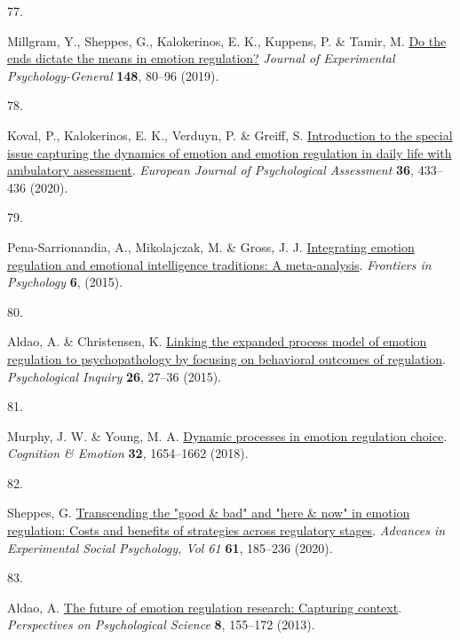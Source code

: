 \documentclass[
  man,floatsintext]{apa6}
\newlength{\cslhangindent}
\newlength{\csllabelwidth}
\newlength{\cslentryspacingunit} %
\newenvironment{CSLReferences}[2] %
 {%
  \setlength{\parindent}{0pt}
  \ifodd #1
  \let\oldpar\par
  \def\par{\hangindent=\cslhangindent\oldpar}
  \fi
  \setlength{\parskip}{#2\cslentryspacingunit}
 }%
 {}
\newcommand{\CSLLeftMargin}[1]{\parbox[t]{\csllabelwidth}{#1}}
\newcommand{\CSLRightInline}[1]{\parbox[t]{\linewidth - \csllabelwidth}{#1}\break}
\begin{document}
\begin{CSLReferences}{0}{0}
\leavevmode{}%
\CSLLeftMargin{77. }%
\CSLRightInline{Millgram, Y., Sheppes, G., Kalokerinos, E. K., Kuppens, P. \& Tamir, M. \href{https://doi.org/10.1037/xge0000477}{Do the ends dictate the means in emotion regulation?} \emph{Journal of Experimental Psychology-General} \textbf{148}, 80--96 (2019).}

\leavevmode{}%
\CSLLeftMargin{78. }%
\CSLRightInline{Koval, P., Kalokerinos, E. K., Verduyn, P. \& Greiff, S. \href{https://doi.org/10.1027/1015-5759/a000599}{Introduction to the special issue capturing the dynamics of emotion and emotion regulation in daily life with ambulatory assessment}. \emph{European Journal of Psychological Assessment} \textbf{36}, 433--436 (2020).}

\leavevmode{}%
\CSLLeftMargin{79. }%
\CSLRightInline{Pena-Sarrionandia, A., Mikolajczak, M. \& Gross, J. J. \href{https://doi.org/ARTN\%20160\%0A10.3389/fpsyg.2015.00160}{Integrating emotion regulation and emotional intelligence traditions: A meta-analysis}. \emph{Frontiers in Psychology} \textbf{6}, (2015).}

\leavevmode{}%
\CSLLeftMargin{80. }%
\CSLRightInline{Aldao, A. \& Christensen, K. \href{https://doi.org/10.1080/1047840x.2015.962399}{Linking the expanded process model of emotion regulation to psychopathology by focusing on behavioral outcomes of regulation}. \emph{Psychological Inquiry} \textbf{26}, 27--36 (2015).}

\leavevmode{}%
\CSLLeftMargin{81. }%
\CSLRightInline{Murphy, J. W. \& Young, M. A. \href{https://doi.org/10.1080/02699931.2017.1419935}{Dynamic processes in emotion regulation choice}. \emph{Cognition \& Emotion} \textbf{32}, 1654--1662 (2018).}

\leavevmode{}%
\CSLLeftMargin{82. }%
\CSLRightInline{Sheppes, G. \href{https://doi.org/10.1016/bs.aesp.2019.09.003}{Transcending the "good \& bad" and "here \& now" in emotion regulation: Costs and benefits of strategies across regulatory stages}. \emph{Advances in Experimental Social Psychology, Vol 61} \textbf{61}, 185--236 (2020).}

\leavevmode{}%
\CSLLeftMargin{83. }%
\CSLRightInline{Aldao, A. \href{https://doi.org/10.1177/1745691612459518}{The future of emotion regulation research: Capturing context}. \emph{Perspectives on Psychological Science} \textbf{8}, 155--172 (2013).}


\end{CSLReferences}
\end{document}
